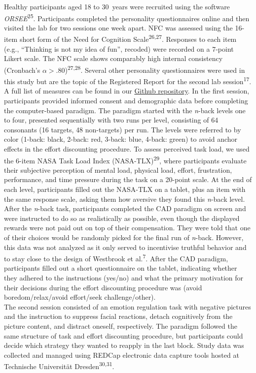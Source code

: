 \documentclass[
  man,floatsintext]{apa6}
\begin{document}
Healthy participants aged 18 to 30~years were recruited using the software \emph{ORSEE}\textsuperscript{25}.
Participants completed the personality questionnaires online and then visited the lab for two sessions one week apart.
NFC was assessed using the 16-item short form of the Need for Cognition Scale\textsuperscript{26,27}.
Responses to each item (e.g., ``Thinking is not my idea of fun'', recoded) were recorded on a 7-point Likert scale.
The NFC scale shows comparably high internal consistency (Cronbach's \(\alpha>.80\))\textsuperscript{27,28}.
Several other personality questionnaires were used in this study but are the topic of the Registered Report for the second lab session\textsuperscript{17}.
A full list of measures can be found in our \href{https://github.com/ChScheffel/CAD}{Github repository}.
In the first session, participants provided informed consent and demographic data before completing the computer-based paradigm.
The paradigm started with the \emph{n}-back levels one to four, presented sequentially with two runs per level, consisting of 64 consonants (16 targets, 48 non-targets) per run.
The levels were referred to by color (1-back: black, 2-back: red, 3-back: blue, 4-back: green) to avoid anchor effects in the effort discounting procedure.
To assess perceived task load, we used the 6-item NASA Task Load Index (NASA-TLX)\textsuperscript{29}, where participants evaluate their subjective perception of mental load, physical load, effort, frustration, performance, and time pressure during the task on a 20-point scale.
At the end of each level, participants filled out the NASA-TLX on a tablet, plus an item with the same response scale, asking them how aversive they found this \emph{n}-back level.
After the \emph{n}-back task, participants completed the CAD paradigm on screen and were instructed to do so as realistically as possible, even though the displayed rewards were not paid out on top of their compensation.
They were told that one of their choices would be randomly picked for the final run of \emph{n}-back.
However, this data was not analyzed as it only served to incentivise truthful behavior and to stay close to the design of Westbrook et al.\textsuperscript{7}.
After the CAD paradigm, participants filled out a short questionnaire on the tablet, indicating whether they adhered to the instructions (yes/no) and what the primary motivation for their decisions during the effort discounting procedure was (avoid boredom/relax/avoid effort/seek challenge/other).\\
The second session consisted of an emotion regulation task with negative pictures and the instruction to suppress facial reactions, detach cognitively from the picture content, and distract oneself, respectively.
The paradigm followed the same structure of task and effort discounting procedure, but participants could decide which strategy they wanted to reapply in the last block.
Study data was collected and managed using REDCap electronic data capture tools hosted at Technische Universität Dresden\textsuperscript{30,31}.
\end{document}

